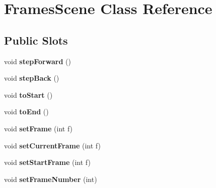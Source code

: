 \hypertarget{class_frames_scene}{
\section{\-Frames\-Scene \-Class \-Reference}
\label{class_frames_scene}
}
\subsection*{\-Public \-Slots}
\begin{DoxyCompactItemize}
\item 
\hypertarget{class_frames_scene_a6cbcb3f062b040315ae15b82376c1ca8}{
void {\bfseries step\-Forward} ()}
\label{class_frames_scene_a6cbcb3f062b040315ae15b82376c1ca8}

\item 
\hypertarget{class_frames_scene_a1244ef310328581087e97e89cfbe54e3}{
void {\bfseries step\-Back} ()}
\label{class_frames_scene_a1244ef310328581087e97e89cfbe54e3}

\item 
\hypertarget{class_frames_scene_a25fc8f29d077761bb7d60dfca96f2a4b}{
void {\bfseries to\-Start} ()}
\label{class_frames_scene_a25fc8f29d077761bb7d60dfca96f2a4b}

\item 
\hypertarget{class_frames_scene_abebcbf8e28f1e33a0f54fe7d60423d76}{
void {\bfseries to\-End} ()}
\label{class_frames_scene_abebcbf8e28f1e33a0f54fe7d60423d76}

\item 
\hypertarget{class_frames_scene_a5f96d7a0cfe8b6a64155f403a08b4c73}{
void {\bfseries set\-Frame} (int f)}
\label{class_frames_scene_a5f96d7a0cfe8b6a64155f403a08b4c73}

\item 
\hypertarget{class_frames_scene_ad6e525495ebd12e82a18781c4db96083}{
void {\bfseries set\-Current\-Frame} (int f)}
\label{class_frames_scene_ad6e525495ebd12e82a18781c4db96083}

\item 
\hypertarget{class_frames_scene_a532f6afc2bd2320628092eb8d95a4bb2}{
void {\bfseries set\-Start\-Frame} (int f)}
\label{class_frames_scene_a532f6afc2bd2320628092eb8d95a4bb2}

\item 
\hypertarget{class_frames_scene_abab171a20974ec4007437a62e955f94c}{
void {\bfseries set\-Frame\-Number} (int)}
\label{class_frames_scene_abab171a20974ec4007437a62e955f94c}

\end{DoxyCompactItemize}
